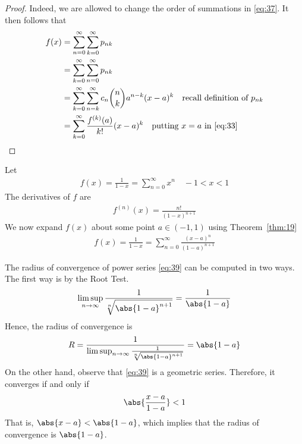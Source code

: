 \documentclass[thmcnt=section, 12pt]{elegantbook}
\begin{document}
\begin{proof}
    \par Indeed, we are allowed to change the order of summations in \eqref{eq:37}. It then follows that 
    \begin{align*}
        f(x) &= \sum_{n=0}^\infty \sum_{k=0}^\infty p_{nk} \\
        &= \sum_{k=0}^\infty \sum_{n=0}^\infty p_{nk} \\
        &= \sum_{k=0}^\infty \sum_{n=k}^\infty c_n \binom{n}{k} a^{n-k} (x-a)^k 
        \quad \text{recall definition of $p_{nk}$}\\ 
        &= \sum_{k=0}^\infty \frac{f^{(k)}(a)}{k!} (x-a)^k 
        \quad \text{putting $x=a$ in \eqref{eq:33}}
    \end{align*}
\end{proof}

\begin{example} \label{eg:3} %
    Let
    \begin{align*}
        f(x) = \frac{1}{1-x} 
        = \sum_{n=0}^\infty x^n
        \quad -1 < x < 1
    \end{align*}
    The derivatives of $f$ are 
    \begin{align*}
        f^{(n)}(x) = \frac{n!}{(1-x)^{n+1}}
    \end{align*}
    We now expand $f(x)$ about some point $a \in (-1, 1)$ using Theorem~\ref{thm:19}
    \begin{align}
        f(x) = \frac{1}{1-x}
        = \sum_{n=0}^\infty \frac{(x-a)^n}{(1-a)^{n+1}}
        \label{eq:39}
    \end{align}

    \par The radius of convergence of power series \eqref{eq:39} can be computed in two ways. The first way is by the Root Test.
    \begin{align*}
        \limsup_{n \to \infty} \frac{1}{\sqrt[n]{\abs{1-a}^{n+1}}}
        = \frac{1}{\abs{1-a}}
    \end{align*}
    Hence, the radius of convergence is 
    \begin{align*}
        R = \frac{1}{\limsup_{n \to \infty} \frac{1}{\sqrt[n]{\abs{1-a}^{n+1}}}}
        = \abs{1-a}
    \end{align*}
    On the other hand, observe that \eqref{eq:39} is a geometric series. Therefore, it converges if and only if 
    \begin{align*}
        \abs{\frac{x-a}{1-a}} < 1
    \end{align*}
    That is, $\abs{x-a} < \abs{1-a}$, which implies that the radius of convergence is $\abs{1-a}$.


\end{example}
\end{document}
